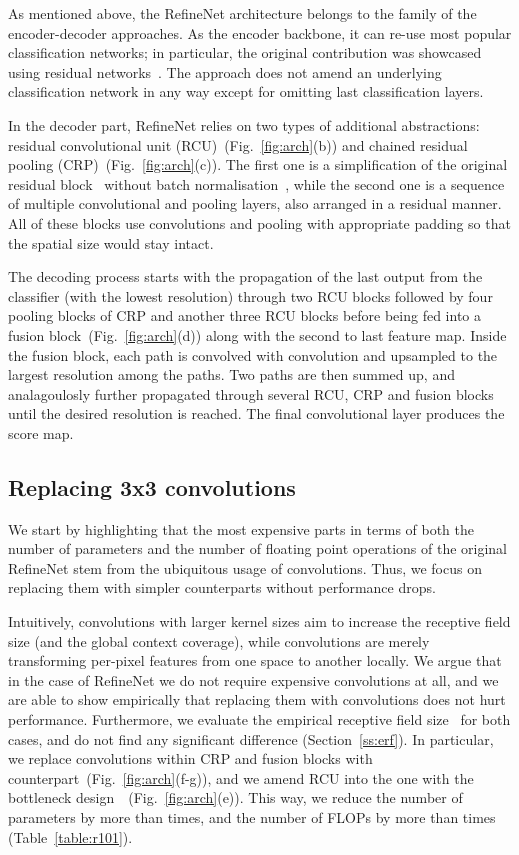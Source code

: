 \documentclass{bmvc2k}
\begin{document}
As mentioned above, the RefineNet architecture belongs to the family of the encoder-decoder approaches. As the encoder backbone, it can re-use most popular classification networks; in particular, the original contribution was showcased using residual networks~\cite{HeZRS16}. The approach does not amend an underlying classification network in any way except for omitting last classification layers.

In the decoder part, RefineNet relies on two types of additional abstractions: residual convolutional unit (RCU)~(Fig.~\ref{fig:arch}(b)) and chained residual pooling (CRP)~(Fig.~\ref{fig:arch}(c)). The first one is a simplification of the original residual block~\cite{HeZRS16} without batch normalisation~\cite{IoffeS15}, while the second one is a sequence of multiple convolutional and pooling layers, also arranged in a residual manner. All of these blocks use  convolutions and  pooling with appropriate padding so that the spatial size would stay intact.

The decoding process starts with the propagation of the last output from the classifier (with the lowest resolution) through two RCU blocks followed by four pooling blocks of CRP and another three RCU blocks before being fed into a fusion block~(Fig.~\ref{fig:arch}(d)) along with the second to last feature map. Inside the fusion block, each path is convolved with  convolution and upsampled to the largest resolution among the paths. Two paths are then summed up, and analagoulosly further propagated through several RCU, CRP and fusion blocks until the desired resolution is reached. The final convolutional layer produces the score map.

\subsection{Replacing 3x3 convolutions}We start by highlighting that the most expensive parts in terms of both the number of parameters and the number of floating point operations of the original RefineNet stem from the ubiquitous usage of  convolutions. Thus, we focus on replacing them with simpler counterparts without performance drops.

Intuitively, convolutions with larger kernel sizes aim to increase the receptive field size (and the global context coverage), while  convolutions are merely transforming per-pixel features from one space to another locally. We argue that in the case of RefineNet we do not require expensive  convolutions at all, and we are able to show empirically that replacing them with  convolutions does not hurt performance. Furthermore, we evaluate the empirical receptive field size~\cite{ZhouKLOT14} for both cases, and do not find any significant difference (Section~\ref{ss:erf}). 
In particular, we replace  convolutions within CRP and fusion blocks with  counterpart~(Fig.~\ref{fig:arch}(f-g)), and we amend RCU into the one with the bottleneck design~\cite{HeZRS16}~(Fig.~\ref{fig:arch}(e)). This way,  we reduce the number of parameters by more than  times, and  the number of FLOPs by more than  times (Table~\ref{table:r101}).
	
\end{document}
